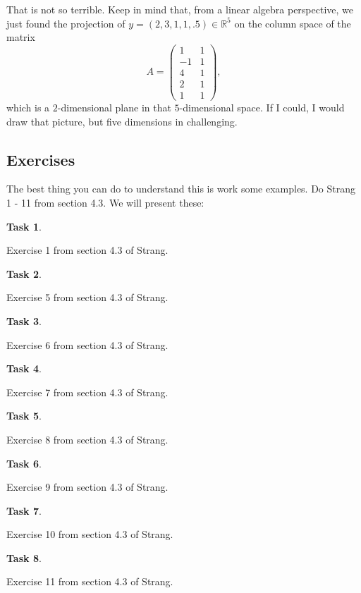 \documentclass[10pt,]{book}
\theoremstyle{plain}
\theoremstyle{definition}
\numberwithin{equation}{section}
\newtheorem{task}{Task}[chapter]
\begin{document}
      That is not so terrible. Keep in mind that, from a linear algebra perspective,
      we just found the projection of \(y = (2,3,1,1,.5) \in \mathbb{R}^5\) on
      the column space of the matrix
      \[
        A = \begin{pmatrix} 1 & 1 \\ -1 & 1\\ 4 & 1 \\ 2 & 1 \\
        1 & 1 \end{pmatrix},
      \]
      which is a \(2\)-dimensional plane in that \(5\)-dimensional space.
      If I could, I would draw that picture, but five dimensions in challenging.
\typeout{************************************************}
\typeout{************************************************}
\subsection[Exercises]{Exercises}\label{subsection-107}

      The best thing you can do to understand this is work some examples. Do
      Strang 1 - 11 from section 4.3. We will present these:
\begin{task}
\label{task-131}

        Exercise 1 from section 4.3 of Strang.
      \end{task}
\begin{task}
\label{task-132}

        Exercise 5 from section 4.3 of Strang.
      \end{task}
\begin{task}
\label{task-133}

        Exercise 6 from section 4.3 of Strang.
      \end{task}
\begin{task}
\label{task-134}

        Exercise 7 from section 4.3 of Strang.
      \end{task}
\begin{task}
\label{task-135}

        Exercise 8 from section 4.3 of Strang.
      \end{task}
\begin{task}
\label{task-136}

        Exercise 9 from section 4.3 of Strang.
      \end{task}
\begin{task}
\label{task-137}

        Exercise 10 from section 4.3 of Strang.
      \end{task}
\begin{task}
\label{task-138}

        Exercise 11 from section 4.3 of Strang.
      \end{task}
\clearpage
\typeout{************************************************}
\typeout{************************************************}
\end{document}
